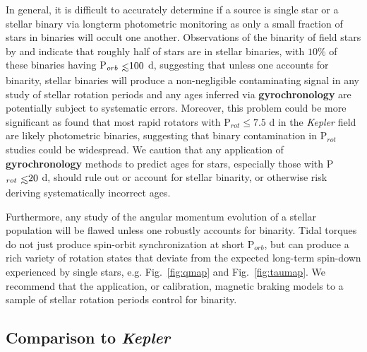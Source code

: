 \documentclass[twocolumn]{aastex61}
\def\lsim{~\rlap{$<$}{\lower 1.0ex\hbox{$\sim$}}}
\newcommand{\xxx}[1]{{\textbf{#1}}}
\newcommand{\kepler}[0]{\textit{Kepler}\xspace}
\begin{document}
In general, it is difficult to accurately determine if a source is single star or a stellar binary via longterm photometric monitoring as only a small fraction of stars in binaries will occult one another. Observations of the binarity of field stars by \citet{Raghavan2010} and \citet{Duchene2013} indicate that roughly half of stars are in stellar binaries, with $10\%$ of these binaries having P$_{orb} \lsim 100$ d, suggesting that unless one accounts for binarity, stellar binaries will produce a non-negligible contaminating signal in any study of stellar rotation periods and any ages inferred via \xxx{gyrochronology} are potentially subject to systematic errors.  Moreover, this problem could be more significant as \citet{Simonian2018} found that most rapid rotators with P$_{rot} \leq 7.5$ d in the \kepler field are likely photometric binaries, suggesting that binary contamination in P$_{rot}$ studies could be widespread. We caution that any application of \xxx{gyrochronology} methods to predict ages for stars, especially those with P$_{rot} \lsim 20$ d, should rule out or account for stellar binarity, or otherwise risk deriving systematically incorrect ages.

Furthermore, any study of the angular momentum evolution of a stellar population will be flawed unless one robustly accounts for binarity.  Tidal torques do not just produce spin-orbit synchronization at short P$_{orb}$, but can produce a rich variety of rotation states that deviate from the expected long-term spin-down experienced by single stars, e.g. Fig.~\ref{fig:qmap} and Fig.~\ref{fig:taumap}. We recommend that the application, or calibration, magnetic braking models to a sample of stellar rotation periods control for binarity.   


\subsection{Comparison to \kepler} \label{sec:kepler}
\end{document}
